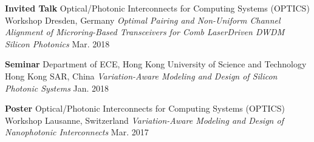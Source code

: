 {    \entryThreeAndTwo%
    {\textbf{Invited Talk}}%
    {Optical/Photonic Interconnects for Computing Systems (OPTICS) Workshop}%
    {Dresden, Germany}%
    {\emph{Optimal Pairing and Non-Uniform Channel Alignment of Microring-Based Transceivers for Comb Laser\textendash Driven DWDM Silicon Photonics}
    }%
    {Mar. 2018}

    \entryThreeAndTwo%
    {\textbf{Seminar}}%
    {Department of ECE, Hong Kong University of Science and Technology}%
    {Hong Kong SAR, China}%
    {\emph{Variation-Aware Modeling and Design of Silicon Photonic Systems}}%
    {Jan. 2018}

    \entryThreeAndTwo%
    {\textbf{Poster}}%
    {Optical/Photonic Interconnects for Computing Systems (OPTICS) Workshop}%
    {Lausanne, Switzerland}%
    {\emph{Variation-Aware Modeling and Design of Nanophotonic Interconnects}}%
    {Mar. 2017}

}